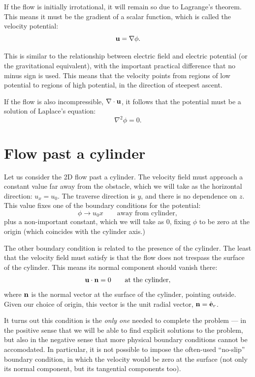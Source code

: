 If the flow is initially irrotational, it will remain so due to
Lagrange's theorem. This means it must be the gradient of a scalar
function, which is called the velocity potential:
\[
\mathbf{u} = \nabla \phi .
\]

This is similar to the relationship between electric field and
electric potential (or the gravitational equivalent), with the
important practical difference that no minus sign is used. This means
that the velocity points from regions of low potential to regions of
high potential, in the direction of steepest ascent.

If the flow is also incompressible, $\nabla\cdot\mathbf{u}$, it follows that
the potential must be a solution of Laplace's equation:
\[
\nabla^2 \phi =0 .
\]



\section{Flow past a cylinder}

Let us consider the 2D flow past a cylinder. The velocity field must
approach a constant value far away from the obstacle, which we will
take as the horizontal direction: $u_x = u_0 $. The traverse direction
is $y$, and there is no dependence on $z$. This value fixes one of the
boundary conditions for the potential:
\[
\phi \to u_0 x \qquad \text{away from cylinder} ,
\]
plus a non-important constant, which we will take as $0$, fixing
$\phi$ to be zero at the origin (which coincides with the cylinder
axis.)

The other boundary condition is related to the presence of the
cylinder. The least that the velocity field must satisfy is that the
flow does not trespass the surface of the cylinder. This means its
normal component should vanish there:
\[
\mathbf{u} \cdot \mathbf{n} = 0  \qquad \text{at the cylinder} ,
\]
where $\mathbf{n}$ is the normal vector at the surface of the cylinder,
pointing outside. Given our choice of origin, this vector is the unit
radial vector, $\mathbf{n} = \hat{\mathbf{e}}_r$.

It turns out this condition is the \emph{only one} needed to complete
the problem --- in the positive sense that we will be able to find
explicit solutions to the problem, but also in the negative sense that
more physical boundary conditions cannot be accomodated. In
particular, it is not possible to impose the often-used ``no-slip''
boundary condition, in which the velocity would be zero at the surface
(not only its normal component, but its tangential components too).

